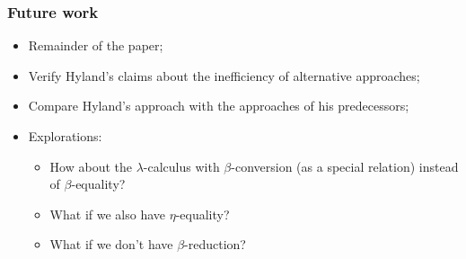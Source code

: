 \documentclass[aspectratio=169]{fancyslides} %
\begin{document}
  \begin{frame}
    \frametitle{Future work}

    \begin{itemize}
      \item Remainder of the paper;
      \item Verify Hyland's claims about the inefficiency of alternative approaches;
      \item Compare Hyland's approach with the approaches of his predecessors;
      \item Explorations:
        \begin{itemize}
          \item How about the $ \lambda $-calculus with $ \beta $-conversion (as a special relation) instead of $ \beta $-equality?
          \item What if we also have $ \eta $-equality?
          \item What if we don't have $ \beta $-reduction?
        \end{itemize}
    \end{itemize}
  \end{frame}
\end{document}
